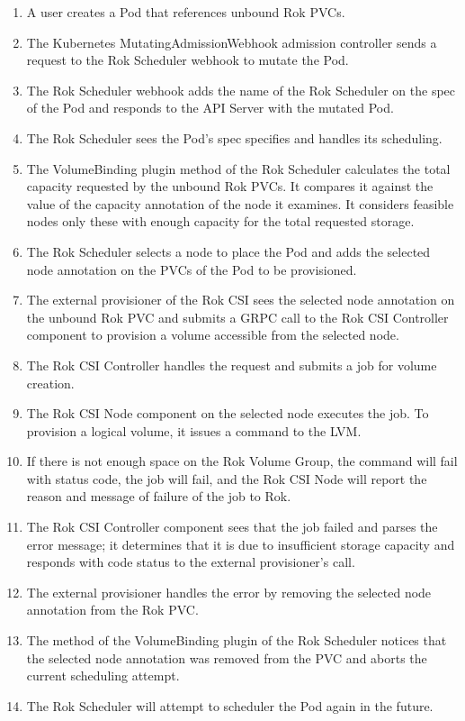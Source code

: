 \begin{enumerate}
      \tightlist
      \item A user creates a Pod that references unbound Rok PVCs.
      \item The Kubernetes MutatingAdmissionWebhook admission controller sends a
            request to the Rok Scheduler webhook to mutate the Pod.
      \item The Rok Scheduler webhook adds the name of the Rok Scheduler on the
            spec of the Pod and responds to the API Server with the mutated Pod.
      \item The Rok Scheduler sees the Pod's spec specifies  and handles its scheduling.
      \item The VolumeBinding plugin  method of the Rok Scheduler
            calculates the total capacity requested by the unbound Rok PVCs. It
            compares it against the value of the capacity annotation of the node
            it examines. It considers feasible nodes only these with enough
            capacity for the total requested storage.
      \item The Rok Scheduler selects a node to place the Pod and adds the
            selected node annotation on the PVCs of the Pod to be provisioned.
      \item The external provisioner of the Rok CSI sees the selected node
            annotation on the unbound Rok PVC and submits a 
            GRPC call to the Rok CSI Controller component to provision a volume
            accessible from the selected node.
      \item The Rok CSI Controller handles the request and submits a job for
            volume creation.
      \item The Rok CSI Node component on the selected node executes the job. To
            provision a logical volume, it issues a  command to the
            LVM.
      \item If there is not enough space on the Rok Volume Group, the
             command will fail with  status
            code, the job will fail, and the Rok CSI Node will report the reason
            and message of failure of the job to Rok.
      \item The Rok CSI Controller component sees that the job failed and parses
            the error message; it determines that it is due to insufficient
            storage capacity and responds with  code
            status to the external provisioner's  call.
      \item The external provisioner handles the  error by
            removing the selected node annotation from the Rok PVC.
      \item The  method of the VolumeBinding plugin of the Rok
            Scheduler notices that the selected node annotation was removed from
            the PVC and aborts the current scheduling attempt.
      \item The Rok Scheduler will attempt to scheduler the Pod again in the
            future.
\end{enumerate}

\clearpage


\clearpage

\clearpage

\clearpage
